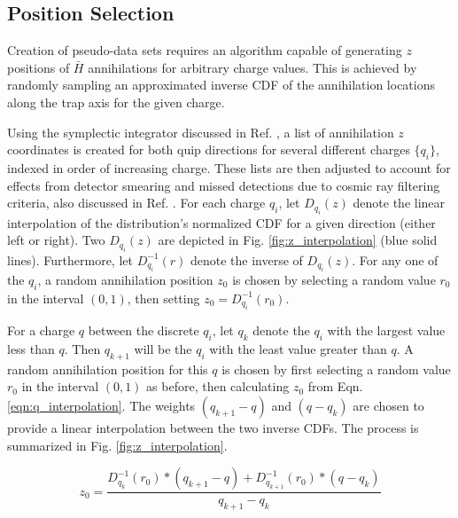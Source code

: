 \documentclass[superscriptaddress,aps,prb,11pt]{revtex4-1}
\begin{document}
\subsection*{Position Selection}
Creation of pseudo-data sets requires an algorithm capable of generating $z$ positions of $\bar{H}$ annihilations for arbitrary charge values.  This is achieved by randomly sampling an approximated inverse CDF of the annihilation locations along the trap axis for the given charge.

Using the symplectic integrator discussed in Ref. , a list of annihilation $z$ coordinates is created for both quip directions for several different charges $\{q_i\}$, indexed in order of increasing charge.  These lists are then adjusted to account for effects from detector smearing and missed detections due to cosmic ray filtering criteria, also discussed in Ref. .  For each charge $q_i$, let $D_{q_i}(z)$ denote the linear interpolation of the distribution's normalized CDF for a given direction (either left or right).  Two $D_{q_i}(z)$ are depicted in Fig. \ref{fig:z_interpolation} (blue solid lines).  Furthermore, let $D^{-1}_{q_i}(r)$ denote the inverse of $D_{q_i}(z)$.  For any one of the $q_i$, a random annihilation position $z_0$ is chosen by selecting a random value $r_0$ in the interval $(0,1)$, then setting $z_0=D^{-1}_{q_i}(r_0)$.

For a charge $q$ between the discrete $q_i$, let $q_k$ denote the $q_i$ with the largest value less than $q$.  Then $q_{k+1}$ will be the $q_i$ with the least value greater than $q$.  A random annihilation position for this $q$ is chosen by first selecting a random value $r_0$ in the interval $(0,1)$ as before, then calculating $z_0$ from Eqn. \ref{eqn:q_interpolation}.  The weights $(q_{k+1}-q)$ and $(q-q_k)$ are chosen to provide a linear interpolation between the two inverse CDFs.  The process is summarized in Fig. \ref{fig:z_interpolation}.

\begin{equation}
z_0=\frac{D^{-1}_{q_k}(r_0)*(q_{k+1}-q) +
 D^{-1}_{q_{k+1}}(r_0)*(q-q_k)}{q_{k+1}-q_k}
\label{eqn:q_interpolation}
\end{equation}
\end{document}
